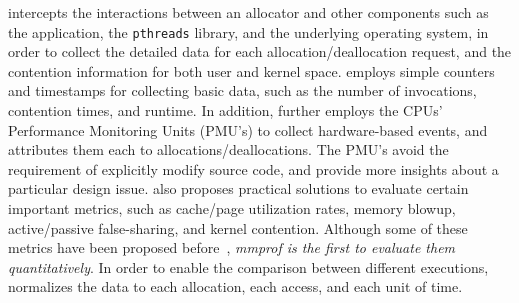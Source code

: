 \MP{} intercepts the interactions between an allocator and other components such as the application, the \texttt{pthreads} library, and the underlying operating system, in order to collect the detailed data for each allocation/deallocation request, and the contention information for both user and kernel space. 
 \MP{} employs simple counters and timestamps for collecting basic data, such as the number of invocations, contention times, and runtime. In addition, \MP{} further employs the CPUs' Performance Monitoring Units (PMU's) to collect hardware-based events, and attributes them each to allocations/deallocations. The PMU's avoid the requirement of explicitly modify source code, and provide more insights about a particular design issue. \MP{} also proposes practical solutions to evaluate certain important metrics, such as cache/page utilization rates, memory blowup, active/passive false-sharing, and kernel contention. Although some of these metrics have been proposed before~\cite{Hoard}, \textit{mmprof is the first to evaluate them quantitatively}. In order to enable the comparison between different executions, \MP{} normalizes the data to each allocation, each access, and each unit of time.  




